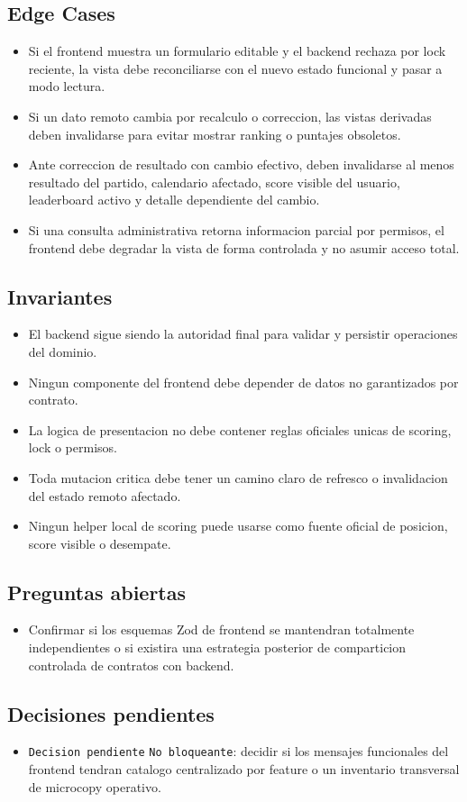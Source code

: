 \subsection{Edge Cases}

\begin{itemize}
  \item Si el frontend muestra un formulario editable y el backend rechaza por lock reciente, la vista debe reconciliarse con el nuevo estado funcional y pasar a modo lectura.
  \item Si un dato remoto cambia por recalculo o correccion, las vistas derivadas deben invalidarse para evitar mostrar ranking o puntajes obsoletos.
  \item Ante correccion de resultado con cambio efectivo, deben invalidarse al menos resultado del partido, calendario afectado, score visible del usuario, leaderboard activo y detalle dependiente del cambio.
  \item Si una consulta administrativa retorna informacion parcial por permisos, el frontend debe degradar la vista de forma controlada y no asumir acceso total.
\end{itemize}

\subsection{Invariantes}

\begin{itemize}
  \item El backend sigue siendo la autoridad final para validar y persistir operaciones del dominio.
  \item Ningun componente del frontend debe depender de datos no garantizados por contrato.
  \item La logica de presentacion no debe contener reglas oficiales unicas de scoring, lock o permisos.
  \item Toda mutacion critica debe tener un camino claro de refresco o invalidacion del estado remoto afectado.
  \item Ningun helper local de scoring puede usarse como fuente oficial de posicion, score visible o desempate.
\end{itemize}

\subsection{Preguntas abiertas}

\begin{itemize}
  \item Confirmar si los esquemas Zod de frontend se mantendran totalmente independientes o si existira una estrategia posterior de comparticion controlada de contratos con backend.
\end{itemize}

\subsection{Decisiones pendientes}

\begin{itemize}
  \item \texttt{Decision pendiente} \texttt{No bloqueante}: decidir si los mensajes funcionales del frontend tendran catalogo centralizado por feature o un inventario transversal de microcopy operativo.
\end{itemize}
